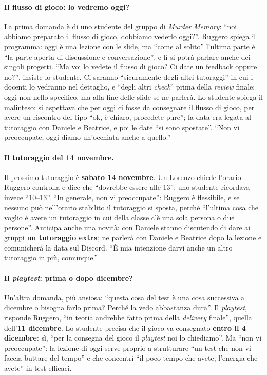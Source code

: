 \paragraph{Il flusso di gioco: lo vedremo oggi?} La prima domanda è di uno studente del
gruppo di \emph{Murder Memory}: ``noi abbiamo preparato il flusso di gioco, dobbiamo
vederlo oggi?''. Ruggero spiega il programma: oggi è una lezione con le slide, ma
``come al solito'' l'ultima parte è ``la parte aperta di discussione e conversazione'',
e lì si potrà parlare anche dei singoli progetti. ``Ma voi lo vedete il flusso di
gioco? Ci date un feedback oppure no?'', insiste lo studente. Ci saranno ``sicuramente
degli altri tutoraggi'' in cui i docenti lo vedranno nel dettaglio, e ``degli altri
\emph{check}'' prima della \emph{review} finale; oggi non nello specifico, ma alla fine
delle slide se ne parlerà. Lo studente spiega il malinteso: si aspettava che per oggi
ci fosse da consegnare il flusso di gioco, per avere un riscontro del tipo ``ok, è
chiaro, procedete pure''; la data era legata al tutoraggio con Daniele e Beatrice, e poi
le date ``si sono spostate''. ``Non vi preoccupate, oggi diamo un'occhiata anche a
quello.''

\paragraph{Il tutoraggio del 14 novembre.} Il prossimo tutoraggio è \textbf{sabato 14
novembre}. Un Lorenzo chiede l'orario: Ruggero controlla e dice che ``dovrebbe essere
alle 13''; uno studente ricordava invece ``10--13''. ``In generale, non vi
preoccupate'': Ruggero è flessibile, e se nessuno può nell'orario stabilito il
tutoraggio si sposta, perché ``l'ultima cosa che voglio è avere un tutoraggio in cui
della classe c'è una sola persona o due persone''. Anticipa anche una novità: con
Daniele stanno discutendo di dare ai gruppi \textbf{un tutoraggio extra}; ne parlerà
con Daniele e Beatrice dopo la lezione e comunicherà la data sul Discord. ``È mia
intenzione darvi anche un altro tutoraggio in più, comunque.''

\paragraph{Il \emph{playtest}: prima o dopo dicembre?} Un'altra domanda, più ansiosa:
``questa cosa del test è una cosa successiva a dicembre o bisogna farlo prima? Perché la
vedo abbastanza dura''. Il \emph{playtest}, risponde Ruggero, ``in teoria andrebbe fatto
prima della \emph{delivery} finale'', quella dell'\textbf{11 dicembre}. Lo studente
precisa che il gioco va consegnato \textbf{entro il 4 dicembre}: sì, ``per la consegna
del gioco il \emph{playtest} noi lo chiediamo''. Ma ``non vi preoccupate'': la lezione
di oggi serve proprio a strutturare ``un test che non vi faccia buttare del tempo'' e
che concentri ``il poco tempo che avete, l'energia che avete'' in test efficaci.

